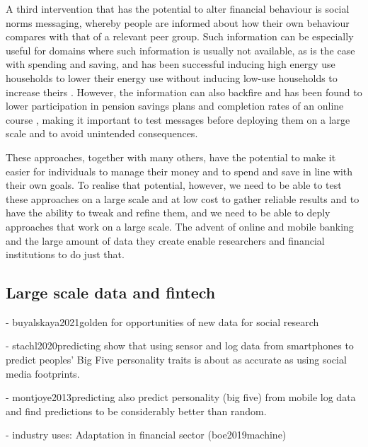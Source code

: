 A third intervention that has the potential to alter financial behaviour is
social norms messaging, whereby people are informed about how their own
behaviour compares with that of a relevant peer group. Such information can be
especially useful for domains where such information is usually not available,
as is the case with spending and saving, and has been successful inducing high
energy use households to lower their energy use without inducing low-use
households to increase theirs \citep{schultz2007constructive,
allcott2011social, allcott2014short, brandon2017effects}. However, the
information can also backfire and has been found to lower participation in
pension savings plans \citep{beshears2015effect} and completion rates of an
online course \citep{rogers2016discouraged}, making it important to test
messages before deploying them on a large scale and to avoid unintended
consequences.

These approaches, together with many others, have the potential to make it
easier for individuals to manage their money and to spend and save in line with
their own goals. To realise that potential, however, we need to be able to test
these approaches on a large scale and at low cost to gather reliable results
and to have the ability to tweak and refine them, and we need to be able to
deply approaches that work on a large scale. The advent of online and mobile
banking and the large amount of data they create enable researchers and
financial institutions to do just that.


\subsection{Large scale data and fintech}%
\label{sub:large_scale_data_and_fintech}



- buyalskaya2021golden for opportunities of new data for social research

- stachl2020predicting show that using sensor and log data from smartphones to
predict peoples' Big Five personality traits is about as accurate as using
social media footprints.

- montjoye2013predicting also predict personality (big five) from mobile log
data and find predictions to be considerably better than random.

- industry uses: Adaptation in financial sector (boe2019machine)



